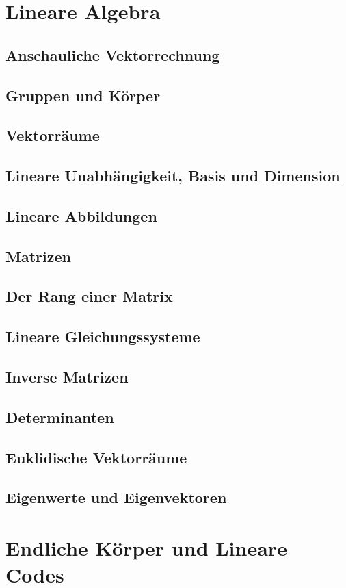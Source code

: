 %
%
%
\section{Lineare Algebra}
\subsection{Anschauliche Vektorrechnung}
\subsection{Gruppen und Körper}
\subsection{Vektorräume}
\subsection{Lineare Unabhängigkeit, Basis und Dimension}
\subsection{Lineare Abbildungen}
\subsection{Matrizen}
\subsection{Der Rang einer Matrix}
\subsection{Lineare Gleichungssysteme}
\subsection{Inverse Matrizen}
\subsection{Determinanten}
\subsection{Euklidische Vektorräume}
\subsection{Eigenwerte und Eigenvektoren}
%
%
%
\section{Endliche Körper und Lineare Codes}
